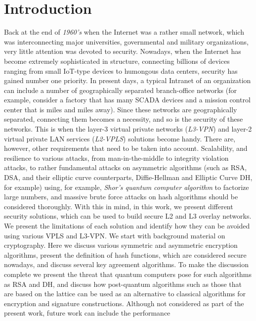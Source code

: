 \chapter{Introduction}

Back at the end of {\it 1960’s} when the Internet was a rather small 
network, which was interconnecting major universities, governmental 
and military organizations, very little attention was devoted to 
security. Nowadays, when the Internet has become extremely 
sophisticated in structure, connecting billions of devices ranging 
from small IoT-type devices to humongous data centers, security has 
gained number one priority. In present days, a typical Intranet of 
an organization can include a number of geographically separated 
branch-office networks (for example, consider a factory that has 
many SCADA devices and a mission control center that is miles and 
miles away). Since these networks are geographically separated, connecting 
them becomes a necessity, and so is the security of these networks. 
This is when the layer-3 virtual private networks ({\it L3-VPN}) and layer-2 
virtual private LAN services ({\it L2-VPLS}) solutions become handy. 
There are, however, other requirements that need to be taken into 
account. Scalability, and resilience to various attacks, from man-in-the-middle 
to integrity violation attacks, to rather fundamental attacks on 
asymmetric algorithms (such as RSA, DSA, and their elliptic curve 
counterparts, Diffie-Hellman and Elliptic Curve DH, for example) 
using, for example, {\it Shor’s quantum computer algorithm} to factorize 
large numbers, and massive brute force attacks on hash algorithms 
should be considered thoroughly. With this in mind, in this work, we 
present different security solutions, which can be used to build secure 
L2 and L3 overlay networks. We present the limitations of each solution 
and identify how they can be avoided using various VPLS and L3-VPN.
We start with background material on cryptography. 
Here we discuss various symmetric and asymmetric encryption algorithms, 
present the definition of hash functions, which are considered secure nowadays, 
and discuss several key agreement algorithms. To make the discussion 
complete we present the threat that quantum computers pose for such 
algorithms as RSA and DH, and discuss how post-quantum algorithms such 
as those that are based on the lattice can be used as an alternative to classical 
algorithms for encryption and signature constructions. Although not considered 
as part of the present work, future work can include the performance 
